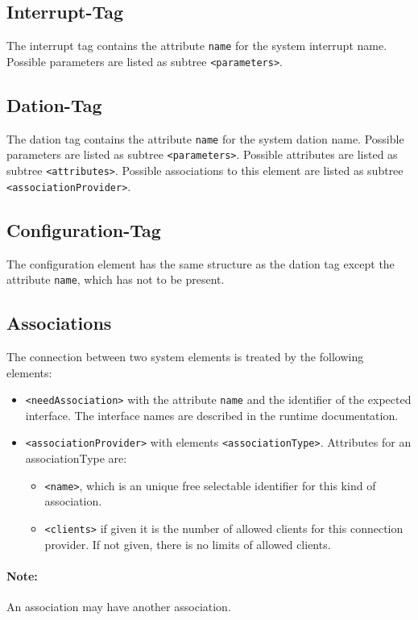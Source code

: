 \subsection{Interrupt-Tag}
The interrupt tag contains the attribute \verb|name| for the
system interrupt name.
Possible parameters are listed as subtree \verb|<parameters>|.

\subsection{Dation-Tag}
The dation tag contains the attribute \verb|name| for the
system dation name.
Possible parameters are listed as subtree \verb|<parameters>|.
Possible attributes are listed as subtree \verb|<attributes>|.
Possible associations to this element are
 listed as subtree \verb|<associationProvider>|.


\subsection{Configuration-Tag}
The configuration element has the same structure as the dation tag
except the attribute \verb|name|, which has not to be present.

\subsection{Associations}
The connection between two system elements is treated by the following
elements:

\begin{itemize}
\item \verb|<needAssociation>| with the attribute 
 \verb|name| and the identifier of the expected interface. The 
  interface names are described in the runtime documentation. 
\item \verb|<associationProvider>|  with elements \verb|<associationType>|.
  Attributes for an associationType are:
  \begin{itemize}
   \item  \verb|<name>|,  which is an unique free selectable
     identifier for this kind of  association.
   \item \verb|<clients>|  if given it is the number of allowed
      clients for this connection provider. If not given, there is no
      limits of allowed clients.
   \end{itemize} 
\end{itemize}

\paragraph{Note:} An association may have another association.
 
